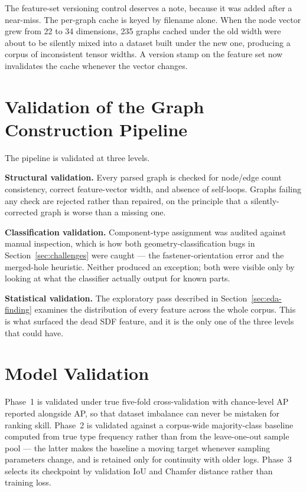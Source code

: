 \documentclass[12pt,oneside,a4paper]{report}
\begin{document}
The feature-set versioning control deserves a note, because it was added after
a near-miss. The per-graph cache is keyed by filename alone. When the node
vector grew from 22 to 34 dimensions, 235 graphs cached under the old width
were about to be silently mixed into a dataset built under the new one,
producing a corpus of inconsistent tensor widths. A version stamp on the
feature set now invalidates the cache whenever the vector changes.

\section{Validation of the Graph Construction Pipeline}

The pipeline is validated at three levels.

\textbf{Structural validation.} Every parsed graph is checked for node/edge
count consistency, correct feature-vector width, and absence of self-loops.
Graphs failing any check are rejected rather than repaired, on the principle
that a silently-corrected graph is worse than a missing one.

\textbf{Classification validation.} Component-type assignment was audited
against manual inspection, which is how both geometry-classification bugs in
Section~\ref{sec:challenges} were caught --- the fastener-orientation error and
the merged-hole heuristic. Neither produced an exception; both were visible
only by looking at what the classifier actually output for known parts.

\textbf{Statistical validation.} The exploratory pass described in
Section~\ref{sec:eda-finding} examines the distribution of every feature across
the whole corpus. This is what surfaced the dead SDF feature, and it is the
only one of the three levels that could have.

\section{Model Validation}

Phase~1 is validated under true five-fold cross-validation with chance-level AP
reported alongside AP, so that dataset imbalance can never be mistaken for
ranking skill. Phase~2 is validated against a corpus-wide majority-class
baseline computed from true type frequency rather than from the leave-one-out
sample pool --- the latter makes the baseline a moving target whenever sampling
parameters change, and is retained only for continuity with older logs. Phase~3
selects its checkpoint by validation IoU and Chamfer distance rather than
training loss.
\end{document}

